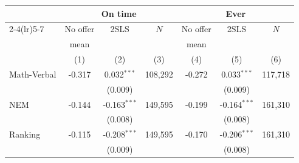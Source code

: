 \begin{tabular}{lcccccc}
\toprule
 & \multicolumn{3}{c}{On time} & \multicolumn{3}{c}{Ever}\\
\cmidrule(lr){2-4}\cmidrule(lr){5-7}
 & No offer & 2SLS & $N$ & No offer & 2SLS & $N$\\
 & mean &  &  & mean &  & \\
 & (1) & (2) & (3) & (4) & (5) & (6)\\
\midrule
Math-Verbal & -0.317 & 0.032$^{***}$ & 108,292 & -0.272 & 0.033$^{***}$ & 117,718\\
 &  & (0.009) &  &  & (0.009) & \\
NEM & -0.144 & -0.163$^{***}$ & 149,595 & -0.199 & -0.164$^{***}$ & 161,310\\
 &  & (0.008) &  &  & (0.008) & \\
Ranking & -0.115 & -0.208$^{***}$ & 149,595 & -0.170 & -0.206$^{***}$ & 161,310\\
 &  & (0.009) &  &  & (0.008) & \\
\bottomrule
\end{tabular}
